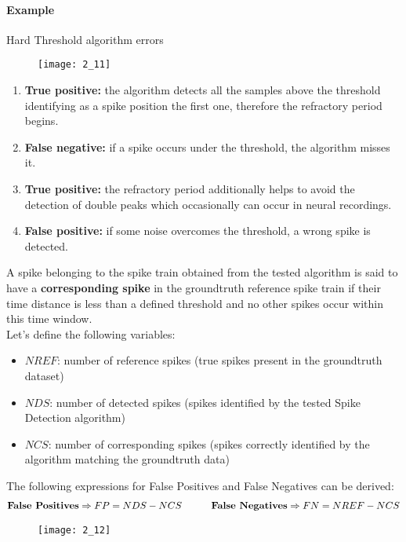 \paragraph{Example} Hard Threshold algorithm errors\\
\begin{figure}[H]
    \centering
    \texttt{[image: 2\_11]}
\end{figure}
\begin{enumerate}
    \item \textbf{True positive:} the algorithm detects all the samples above the threshold
          identifying as a spike position the first one, therefore the refractory period begins.
    \item \textbf{False negative:} if a spike occurs under the threshold, the algorithm
          misses it.
    \item \textbf{True positive:} the refractory period additionally helps to avoid the
          detection of double peaks which occasionally can occur in neural recordings.
    \item \textbf{False positive:} if some noise overcomes the threshold,
          a wrong spike is detected.
\end{enumerate}
A spike belonging to the spike train obtained from the tested algorithm is said to
have a \textbf{corresponding spike} in the groundtruth reference spike train if their
time distance is less than a defined threshold and no other spikes occur within
this time window.\\
Let's define the following variables:
\begin{itemize}
    \item \(NREF\): number of reference spikes (true spikes present in the groundtruth
          dataset)
    \item \(NDS\): number of detected spikes (spikes identified by the tested Spike
          Detection algorithm)
    \item \(NCS\): number of corresponding spikes (spikes correctly identified by
          the algorithm matching the groundtruth data)
\end{itemize}
The following expressions for False Positives and False Negatives can be derived:
\begin{align*}
    \text{\textbf{False Positives}}\Rightarrow FP=NDS-NCS
    \quad\quad\quad
    \text{\textbf{False Negatives}}\Rightarrow FN=NREF-NCS
\end{align*}
\begin{figure}[H]
    \texttt{[image: 2\_12]}
    \centering
\end{figure}
